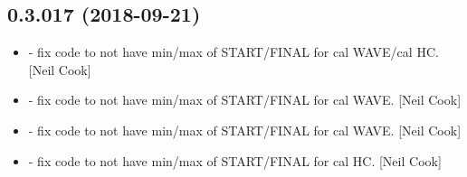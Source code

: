 \documentclass[a4paper,10pt,english]{report}
\begin{document}
\subsection{0.3.017 (2018-09-21)}
\label{\detokenize{misc/changelog:id314}}\begin{itemize}
\item {} 
 - fix code to not have min/max of 
START/FINAL for cal WAVE/cal HC. {[}Neil Cook{]}

\item {} 
 - fix code to not have min/max of 
START/FINAL for cal WAVE. {[}Neil Cook{]}

\item {} 
 - fix code to not have min/max of
 START/FINAL for cal WAVE. {[}Neil Cook{]}

\item {} 
 - fix code to not have min/max of 
START/FINAL for cal HC. {[}Neil Cook{]}

\end{itemize}
\end{document}
